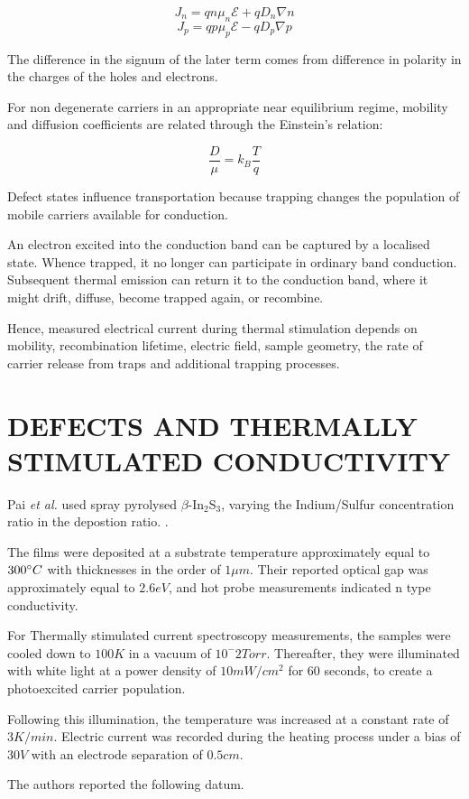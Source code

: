 \documentclass[letterpaper, 10pt, conference]{ieeeconf}
\begin{document}
$$ J_n=qn\mu_n\mathcal{E}+qD_n\nabla n $$
$$ J_p=qp\mu_p\mathcal{E}-qD_p\nabla p $$

The difference in the signum of the later term comes from difference in polarity in the charges of the holes and electrons.

For non degenerate carriers in an appropriate near equilibrium regime, mobility and diffusion coefficients are related through the Einstein's relation:

$$ \frac{D}{\mu} = k_B\frac{T}{q} $$

Defect states influence transportation because trapping changes the population of mobile carriers available for conduction.

An electron excited into the conduction band can be captured by a localised state. Whence trapped, it no longer can participate in ordinary band conduction. Subsequent thermal emission can return it to the conduction band, where it might drift, diffuse, become trapped again, or recombine.

Hence, measured electrical current during thermal stimulation depends on mobility, recombination lifetime, electric field, sample geometry, the rate of carrier release from traps and additional trapping processes.

\section{DEFECTS AND THERMALLY STIMULATED CONDUCTIVITY}
Pai \emph{et al.} used spray pyrolysed $\beta$-In$_2$S$_3$, varying the Indium/Sulfur concentration ratio in the depostion ratio. \cite{pai}.

The films were deposited at a substrate temperature approximately equal to $300 \degree C$ with thicknesses in the order of $1 \mu m$. Their reported optical gap was approximately equal to $2.6 eV$, and hot probe measurements indicated n type conductivity.

For Thermally stimulated current spectroscopy measurements, the samples were cooled down to $100K$ in a vacuum of $10^-2 Torr$. Thereafter, they were illuminated with white light at a power density of $10 mW/cm^2$ for $60$ seconds, to create a photoexcited carrier population.

Following this illumination, the temperature was increased at a constant rate of $3 K/min$. Electric current was recorded during the heating process under a bias of $30 V$ with an electrode separation of $0.5 cm$.

The authors reported the following datum.
\end{document}
